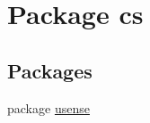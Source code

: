 \hypertarget{namespacecs}{}\section{Package cs}
\label{namespacecs}
\subsection*{Packages}
\begin{DoxyCompactItemize}
\item 
package \hyperlink{namespacecs_1_1usense}{usense}
\end{DoxyCompactItemize}
